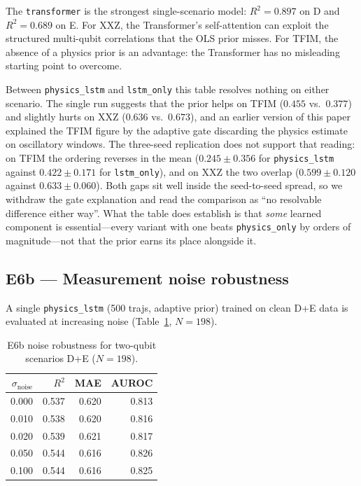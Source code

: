 \documentclass[twocolumn,10pt]{article}
\begin{document}
The \texttt{transformer} is the strongest single-scenario model:
$R^2 = 0.897$ on D and $R^2 = 0.689$ on E.
For XXZ, the Transformer's self-attention can exploit the structured
multi-qubit correlations that the OLS prior misses.
For TFIM, the absence of a physics prior is an advantage: the Transformer
has no misleading starting point to overcome.

Between \texttt{physics\_lstm} and \texttt{lstm\_only} this table
resolves nothing on either scenario.
The single run suggests that the prior helps on TFIM ($0.455$ vs.\
$0.377$) and slightly hurts on XXZ ($0.636$ vs.\ $0.673$), and an
earlier version of this paper explained the TFIM figure by the adaptive
gate discarding the physics estimate on oscillatory windows.
The three-seed replication does not support that reading: on TFIM the
ordering reverses in the mean ($0.245 \pm 0.356$ for
\texttt{physics\_lstm} against $0.422 \pm 0.171$ for
\texttt{lstm\_only}), and on XXZ the two overlap
($0.599 \pm 0.120$ against $0.633 \pm 0.060$).
Both gaps sit well inside the seed-to-seed spread, so we withdraw the
gate explanation and read the comparison as ``no resolvable difference
either way''.
What the table does establish is that \emph{some} learned component is
essential---every variant with one beats \texttt{physics\_only} by
orders of magnitude---not that the prior earns its place alongside it.

\subsection{E6b --- Measurement noise robustness}
\label{sec:e3}

A single \texttt{physics\_lstm} (500 trajs, adaptive prior) trained on
clean D+E data is evaluated at increasing noise (Table~\ref{tab:e3_2},
$N = 198$).

\begin{table}[h]
\centering
\caption{E6b noise robustness for two-qubit scenarios D+E
  ($N=198$).\label{tab:e3_2}}
\small
\begin{tabular}{rrrr}
\toprule
$\sigma_\mathrm{noise}$ & $R^2$ & MAE & AUROC \\
\midrule
0.000 & 0.537 & 0.620 & 0.813 \\
0.010 & 0.538 & 0.620 & 0.816 \\
0.020 & 0.539 & 0.621 & 0.817 \\
0.050 & 0.544 & 0.616 & 0.826 \\
0.100 & 0.544 & 0.616 & 0.825 \\
\bottomrule
\end{tabular}
\end{table}
\end{document}
